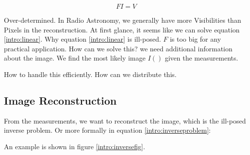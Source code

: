 \begin{equation}\label{intro:linear}
FI = V
\end{equation}

Over-determined. In Radio Astronomy, we generally have more Visibilities than Pixels in the reconstruction. At first glance, it seems like we can solve equation \eqref{intro:linear}. 
Why equation \eqref{intro:linear} is ill-posed. 
$F$ is too big for any practical application.
How can we solve this? we need additional information about the image. We find the most likely image $I()$ given the measurements.

How to handle this efficiently.
How can we distribute this.


\subsection{Image Reconstruction}
From the measurements, we want to reconstruct the image, which is the ill-posed inverse problem. Or more formally in equation \eqref{intro:inverseproblem}:

An example is shown in figure \ref{intro:inversefig}.

